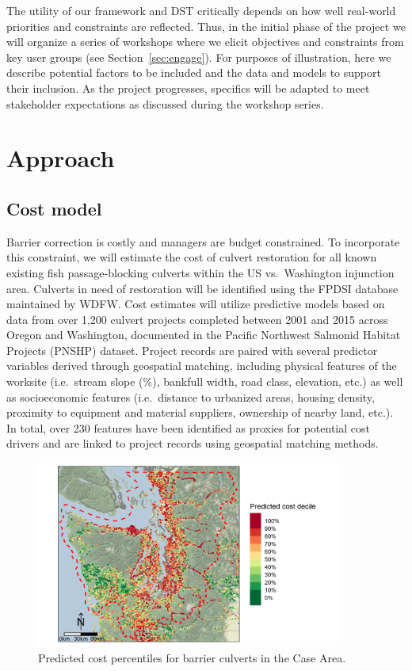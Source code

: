 \documentclass[12pt]{elsarticle}
\begin{document}
The utility of our framework and DST critically depends on how well real-world priorities and constraints are reflected. Thus, in the initial phase of the project we will organize a series of workshops where we elicit objectives and constraints from key user groups (see Section~\ref{sec:engage}). For purposes of illustration, here we describe potential factors to be included and the data and models to support their inclusion. As the project progresses, specifics will be adapted to meet stakeholder expectations as discussed during the workshop series.  
%
\section{Approach}

\subsection{Cost model}

Barrier correction is costly and managers are budget constrained. To incorporate this constraint, we will estimate the cost of culvert restoration for all known existing fish passage-blocking culverts within the US vs.\ Washington injunction area. Culverts in need of restoration will be identified using the FPDSI database maintained by WDFW. Cost estimates will utilize predictive models based on data from over 1,200 culvert projects completed between 2001 and 2015 across Oregon and Washington, documented in the Pacific Northwest Salmonid Habitat Projects (PNSHP) dataset. Project records are paired with several predictor variables derived through geospatial matching, including physical features of the worksite (i.e.\ stream slope (\%), bankfull width, road class, elevation, etc.) as well as socioeconomic features (i.e.\ distance to urbanized areas, housing density, proximity to equipment and material suppliers, ownership of nearby land, etc.). In total, over 230 features have been identified as proxies for potential cost drivers and are linked to project records using geospatial matching methods. 

\begin{figure}[h]
	\centering
	\includegraphics[width=10cm]{figures/predCost.png}
	\caption{Predicted cost percentiles for barrier culverts in the Case Area.\label{fig:cost}}
\end{figure}%
\end{document}
